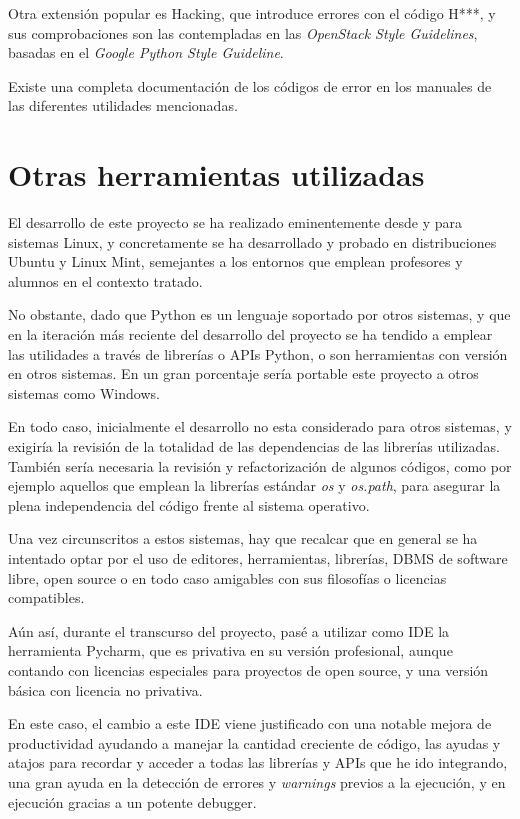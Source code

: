Otra extensión popular es Hacking, que introduce errores con el código H***, y sus comprobaciones son las contempladas en las \textit{OpenStack Style Guidelines}, basadas en el \textit{Google Python Style Guideline}.

Existe una completa documentación de los códigos de error en los manuales de las diferentes utilidades mencionadas.


\section{Otras herramientas utilizadas} 
\label{sec:otras_herramientas}

El desarrollo de este proyecto se ha realizado eminentemente desde y para sistemas Linux, y concretamente se ha desarrollado y probado en distribuciones Ubuntu y Linux Mint, semejantes a los entornos que emplean profesores y alumnos en el contexto tratado.

No obstante, dado que Python es un lenguaje soportado por otros sistemas, y que en la iteración más reciente del desarrollo del proyecto se ha tendido a emplear las utilidades a través de librerías o APIs Python, o son herramientas con versión en otros sistemas. En un gran porcentaje sería portable este proyecto a otros sistemas como Windows.

En todo caso, inicialmente el desarrollo no esta considerado para otros sistemas, y exigiría la revisión de la totalidad de las dependencias de las librerías utilizadas. También sería necesaria la revisión y refactorización de algunos códigos, como por ejemplo  aquellos que emplean la librerías estándar \textit{os} y \textit{os.path}, para asegurar la plena independencia del código frente al sistema operativo.


Una vez circunscritos a estos sistemas, hay que recalcar que en general se ha intentado optar por el uso de editores, herramientas, librerías, DBMS de software libre, open source o en todo caso amigables con sus filosofías o licencias compatibles.


Aún así, durante el transcurso del proyecto, pasé a utilizar como IDE la herramienta Pycharm, que es privativa en su versión profesional, aunque contando con licencias especiales para proyectos de open source, y una versión básica con licencia no privativa.


En este caso, el cambio a este IDE viene justificado con una notable mejora de productividad ayudando a manejar la cantidad creciente de código, las ayudas y atajos para recordar y acceder a todas las librerías y APIs que he ido integrando, una gran ayuda en la detección de errores y \textit{warnings} previos a la ejecución, y en ejecución gracias a un potente debugger.



